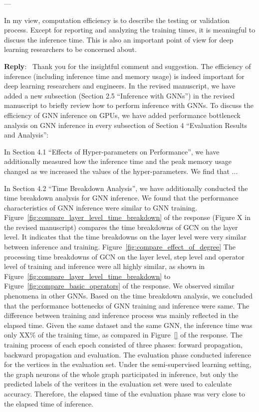 \documentclass[12pt]{article}
\newcounter{reviewer}
\newcounter{point}[reviewer]
\renewcommand{\thepoint}{P\,\thereviewer.\arabic{point}}
\newenvironment{point}
   {\refstepcounter{point} \bigskip \noindent {\textbf{Reviewer~Point~\thepoint} } ---\ \begin{sf}}
   {\end{sf} \par}
\newenvironment{reply}
   {\medskip \noindent \textbf{Reply}:\  }
   {\medskip}
\begin{document}
\begin{point}
    In my view, computation efficiency is to describe the testing or validation process. Except for reporting and analyzing the training times, it is meaningful to discuss the inference time. This is also an important point of view for deep learning researchers to be concerned about.
\end{point}

\begin{reply}
    Thank you for the insightful comment and suggestion.
    The efficiency of inference (including inference time and memory usage) is indeed important for deep learning researchers and engineers.
    In the revised manuscript, we have added a new subsection (Section 2.5 ``Inference with GNNs'') in the revised manuscript to briefly review how to perform inference with GNNs.
    To discuss the efficiency of GNN inference on GPUs, we have added performance bottleneck analysis on GNN inference in every subsection of Section 4 ``Evaluation Results and Analysis'':
   

    In Section 4.1 ``Effects of Hyper-parameters on Performance'', we have additionally measured how the inference time and the peak memory usage changed as we increased the values of the hyper-parameters.
    We find that ...
        
    In Section 4.2 ``Time Breakdown Analysis'', we have additionally conducted the time breakdown analysis for GNN inference.
    We found that the performance characteristics of GNN inference were similar to GNN training.
    Figure~\ref{fig:compare_layer_level_time_breakdown} of the response (Figure X in the revised manuscript) compares the time breakdowns of GCN on the layer level.
    It indicates that the time breakdowns on the layer level were very similar between inference and training.
    Figure~\ref{fig:compare_effect_of_degree}
    The processing time breakdowns of GCN on the layer level, step level and operator level of training and inference were all highly similar, as shown in Figure~\ref{fig:compare_layer_level_time_breakdown} to Figure~\ref{fig:compare_basic_operators} of the response.
    We observed similar phenomena in other GNNs.
    Based on the time breakdown analysis, we concluded that the performance bottenecks of GNN training and inference were same.
    The difference between training and inference process was mainly reflected in the elapsed time.
    Given the same dataset and the same GNN, the inference time was only XX\% of the training time, as compared in Figure~\ref{} of the response.
    The training process of each epoch consisted of three phases: forward propagation, backward propagation and evaluation.
    The evaluation phase conducted inference for the vertices in the evaluation set.
    Under the semi-supervised learning setting, the graph neurons of the whole graph participated in inference, but only the predicted labels of the veritces in the evaluation set were used to calculate accuracy.
    Therefore, the elapsed time of the evaluation phase was very close to the elapsed time of inference.
      

\end{reply}
\end{document}
